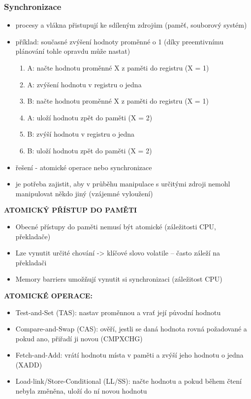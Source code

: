 \documentclass[10pt,a4paper]{article}
\begin{document}
\subsubsection{Synchronizace}
\begin{itemize}
	\item procesy a vlákna přistupují ke sdíleným zdrojům (paměť, souborový systém)
	\item příklad: současné zvýšení hodnoty proměnné o 1 (díky preemtivnímu plánování tohle opravdu může nastat)
	\begin{enumerate}
		\item A: načte hodnotu proměnné X z paměti do registru (X = 1)
		\item A: zvýšení hodnotu v registru o jedna
		\item B: načte hodnotu proměnné X z paměti do registru (X = 1)
		\item A: uloží hodnotu zpět do paměti (X = 2)
		\item B: zvýší hodnotu v registru o jedna
		\item B: uloží hodnotu zpět do paměti (X = 2)
	\end{enumerate}
	\item řešení - atomické operace nebo synchronizace
	\item je potřeba zajistit, aby v průběhu manipulace s určitými zdroji nemohl manipulovat někdo jiný (vzájemné vyloužení)
\end{itemize}

\textbf{ATOMICKÝ PŘÍSTUP DO PAMĚTI}
\begin{itemize}
	\item Obecné přístupy do paměti nemusí být atomické (záležitosti CPU, překladače)
	\item Lze vynutit určité chování -> klíčové slovo volatile – často záleží na překladači
	\item Memory barriers umožňují vynutit si synchronizaci (záležitost CPU)
\end{itemize}

\textbf{ATOMICKÉ OPERACE:}
\begin{itemize}
	\item Test-and-Set (TAS): nastav proměnnou a vrať její původní hodnotu
	\item Compare-and-Swap (CAS): ověří, jestli se daná hodnota rovná požadované a pokud ano, přiřadí ji novou (CMPXCHG)
	\item Fetch-and-Add: vrátí hodnotu místa v paměti a zvýší jeho hodnotu o jedna (XADD)
	\item Load-link/Store-Conditional (LL/SS): načte hodnotu a pokud během čtení nebyla změněna, uloží do ní novou hodnotu
\end{itemize}
\end{document}
